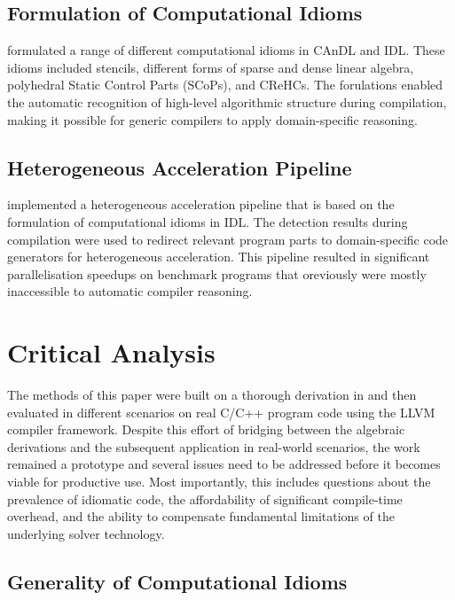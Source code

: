 \subsection*{Formulation of Computational Idioms}

     formulated a range of
    different computational idioms in CAnDL and IDL.
    These idioms included stencils, different forms of sparse and dense linear
    algebra, polyhedral Static Control Parts (SCoPs), and CReHCs.
    The forulations enabled the automatic recognition of high-level algorithmic
    structure during compilation, making it possible for generic compilers to
    apply domain-specific reasoning.

\subsection*{Heterogeneous Acceleration Pipeline}

     implemented a heterogeneous acceleration pipeline that
    is based on the formulation of computational idioms in IDL.
    The detection results during compilation were used to redirect relevant
    program parts to domain-specific code generators for heterogeneous
    acceleration.
    This pipeline resulted in significant parallelisation speedups on benchmark
    programs that oreviously were mostly inaccessible to automatic compiler
    reasoning.

\section{Critical Analysis}

    The methods of this paper were built on a thorough derivation in
     and then evaluated in different scenarios on real
    C/C++ program code using the LLVM compiler framework.
    Despite this effort of bridging between the algebraic derivations and the
    subsequent application in real-world scenarios, the work remained a
    prototype and several issues need to be addressed before it becomes viable
    for productive use.
    Most importantly, this includes questions about the prevalence of idiomatic
    code, the affordability of significant compile-time overhead, and the
    ability to compensate fundamental limitations of the underlying solver
    technology.

\subsection*{Generality of Computational Idioms}  

